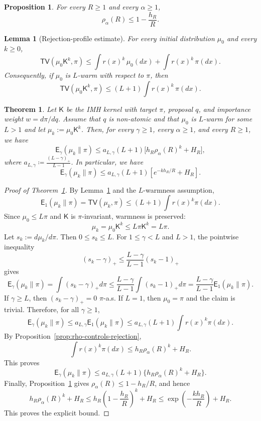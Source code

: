 \documentclass[10pt,a4paper]{amsart}
\newtheorem{proposition}{Proposition}
\newtheorem{theorem}{Theorem}
\newtheorem{lemma}{Lemma}
\newcommand{\sK}{\mathsf{K}}
\begin{document}
\begin{proposition}
\label{prop:localSDPI_IMH}
For every $R\ge 1$ and every $\alpha\ge 1$,
$$\rho_\alpha(R)\le 1-\frac{h_R}{R}.$$
\end{proposition}

\begin{lemma}[Rejection-profile estimate] \label{lem:rejection-profile} For every initial distribution $\mu_0$ and every $k\ge0$, $$\mathsf{TV}(\mu_0\sK^k,\pi)\le \int r(x)^k\,\mu_0(dx)+\int r(x)^k\,\pi(dx).$$ Consequently, if $\mu_0$ is $L$-warm with respect to $\pi$, then $$\mathsf{TV}(\mu_0\sK^k,\pi)\le (L+1)\int r(x)^k\,\pi(dx).$$ \end{lemma}

\begin{theorem}\label{thm:imh-hs-rejection-profile}
Let $\sK$ be the IMH kernel with target $\pi$, proposal $q$, and importance weight $w=d\pi/dq$. Assume that $q$ is non-atomic and that $\mu_0$ is $L$-warm for some $L>1$ and let $\mu_k:=\mu_0\sK^k$.
Then, for every $\gamma\ge 1$, every $\alpha\ge 1$, and every $R\ge 1$, we have 
\begin{equation}\label{eq:mainthm}
    \mathsf E_\gamma(\mu_k\|\pi)\le a_{L,\gamma}(L+1)\Big[h_R\rho_\alpha(R)^k+H_R\Big],
\end{equation}
where $a_{L,\gamma}\coloneqq \frac{(L-\gamma)_+}{L-1}$. In particular, we have 
$$\mathsf E_\gamma(\mu_k\|\pi)\le a_{L,\gamma}(L+1)\left[e^{-kh_R/R}+H_R\right].$$
\end{theorem}

\begin{proof}[Proof of Theorem~\ref{thm:imh-hs-rejection-profile}]
By Lemma~\ref{lem:rejection-profile} and the $L$-warmness assumption,
$$\mathsf E_1(\mu_k\|\pi)=\mathsf{TV}(\mu_k,\pi)\le (L+1)\int r(x)^k\pi(dx).$$
Since $\mu_0\le L\pi$ and $\sK$ is $\pi$-invariant, warmness is preserved:
$$\mu_k=\mu_0\sK^k\le L\pi\sK^k=L\pi.$$
Let $s_k:=d\mu_k/d\pi$. Then $0\le s_k\le L$. For $1\le\gamma<L$ and $L>1$, the pointwise inequality
$$ (s_k-\gamma)_+\le \frac{L-\gamma}{L-1}(s_k-1)_+ $$
gives
$$\mathsf E_\gamma(\mu_k\|\pi)=\int(s_k-\gamma)_+d\pi\le \frac{L-\gamma}{L-1}\int(s_k-1)_+d\pi=\frac{L-\gamma}{L-1}\mathsf E_1(\mu_k\|\pi).$$
If $\gamma\ge L$, then $(s_k-\gamma)_+=0$ $\pi$-a.s. If $L=1$, then $\mu_0=\pi$ and the claim is trivial. Therefore, for all $\gamma\ge1$,
$$\mathsf E_\gamma(\mu_k\|\pi)\le a_{L,\gamma}\mathsf E_1(\mu_k\|\pi)\le a_{L,\gamma}(L+1)\int r(x)^k\pi(dx).$$
By Proposition~\ref{prop:rho-controls-rejection},
$$\int r(x)^k\pi(dx)\le h_R\rho_\alpha(R)^k+H_R.$$
This proves
$$\mathsf E_\gamma(\mu_k\|\pi)\le a_{L,\gamma}(L+1)\{h_R\rho_\alpha(R)^k+H_R\}.$$
Finally, Proposition~\ref{prop:localSDPI_IMH} gives $\rho_\alpha(R)\le 1-h_R/R$, and hence
$$h_R\rho_\alpha(R)^k+H_R\le h_R\left(1-\frac{h_R}{R}\right)^k+H_R\le \exp\left(-\frac{kh_R}{R}\right)+H_R.$$
This proves the explicit bound.
\end{proof}
\end{document}
